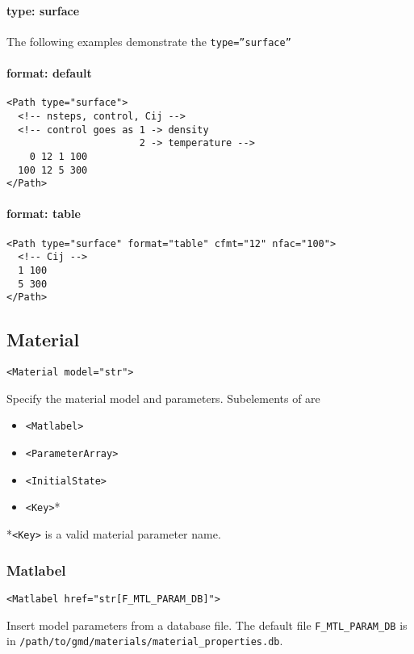 \documentclass[11pt]{report}
\renewcommand{\tag}[1]{\texttt{<#1>}}
\newcommand{\reqdtag}[1]{\Red{\texttt{<#1>}}}
\begin{document}
\paragraph{type: surface} The following examples demonstrate the
\texttt{type=''surface''}

\paragraph{format: default}
\begin{verbatim}
<Path type="surface">
  <!-- nsteps, control, Cij -->
  <!-- control goes as 1 -> density
                       2 -> temperature -->
    0 12 1 100
  100 12 5 300
</Path>
\end{verbatim}

\paragraph{format: table}
\begin{verbatim}
<Path type="surface" format="table" cfmt="12" nfac="100">
  <!-- Cij -->
  1 100
  5 300
</Path>
\end{verbatim}

\subsection{Material}
\begin{verbatim}
<Material model="str">
\end{verbatim}
%
Specify the material model and parameters. Subelements of \reqdtag{Material}
are
%
\begin{itemize}
  \item \tag{Matlabel}
  \item \tag{ParameterArray}
  \item \tag{InitialState}
  \item \tag{Key}*
\end{itemize}
%
*\tag{Key} is a valid material parameter name.

\subsubsection{Matlabel}
\begin{verbatim}
<Matlabel href="str[F_MTL_PARAM_DB]">
\end{verbatim}
%
Insert model parameters from a database file.  The default file
\verb:F_MTL_PARAM_DB: is in \verb:/path/to/gmd/materials/material_properties.db:.
\end{document}
